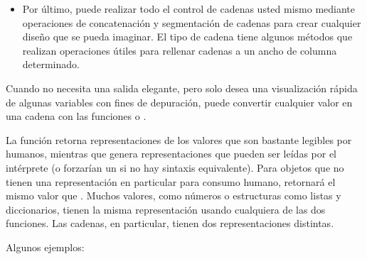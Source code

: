 \documentclass[a4,10pt,spanish]{sphinxmanual}
\begin{document}
\begin{itemize}
\item {} 
\sphinxAtStartPar
Por último, puede realizar todo el control de cadenas usted mismo mediante operaciones de concatenación y segmentación de cadenas para crear cualquier diseño que se pueda imaginar.  El tipo de cadena tiene algunos métodos que realizan operaciones útiles para rellenar cadenas a un ancho de columna determinado.

\end{itemize}

\sphinxAtStartPar
Cuando no necesita una salida elegante, pero solo desea una visualización rápida de algunas variables con fines de depuración, puede convertir cualquier valor en una cadena con las funciones  o .

\sphinxAtStartPar
La función  retorna representaciones de los valores que son bastante legibles por humanos, mientras que  genera representaciones que pueden ser leídas por el intérprete (o forzarían un  si no hay sintaxis equivalente).  Para objetos que no tienen una representación en particular para consumo humano,  retornará el mismo valor que .  Muchos valores, como números o estructuras como listas y diccionarios, tienen la misma representación usando cualquiera de las dos funciones.  Las cadenas, en particular, tienen dos representaciones distintas.

\sphinxAtStartPar
Algunos ejemplos:
\end{document}
